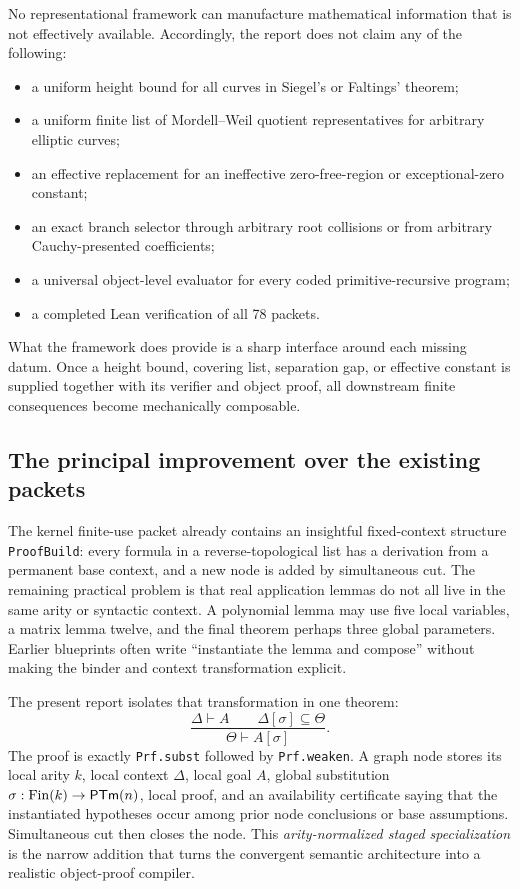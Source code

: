 No representational framework can manufacture mathematical information that is not effectively available.
Accordingly, the report does not claim any of the following:
\begin{itemize}
  \item a uniform height bound for all curves in Siegel's or Faltings' theorem;
  \item a uniform finite list of Mordell--Weil quotient representatives for arbitrary elliptic curves;
  \item an effective replacement for an ineffective zero-free-region or exceptional-zero constant;
  \item an exact branch selector through arbitrary root collisions or from arbitrary Cauchy-presented
        coefficients;
  \item a universal object-level evaluator for every coded primitive-recursive program;
  \item a completed Lean verification of all 78 packets.
\end{itemize}
What the framework does provide is a sharp interface around each missing datum.  Once a height bound,
covering list, separation gap, or effective constant is supplied together with its verifier and object
proof, all downstream finite consequences become mechanically composable.

\subsection{The principal improvement over the existing packets}

The kernel finite-use packet already contains an insightful fixed-context structure \texttt{ProofBuild}:
every formula in a reverse-topological list has a derivation from a permanent base context, and a new node
is added by simultaneous cut.  The remaining practical problem is that real application lemmas do not all
live in the same arity or syntactic context.  A polynomial lemma may use five local variables, a matrix
lemma twelve, and the final theorem perhaps three global parameters.  Earlier blueprints often write
``instantiate the lemma and compose'' without making the binder and context transformation explicit.

The present report isolates that transformation in one theorem:
\begin{equation}
\label{eq:instantiate-into}
  \frac{\Delta\vdash A \qquad
        \Delta[\sigma]\subseteq\Theta}
       {\Theta\vdash A[\sigma]}.
\end{equation}
The proof is exactly \texttt{Prf.subst} followed by \texttt{Prf.weaken}.  A graph node stores its local
arity \(k\), local context \(\Delta\), local goal \(A\), global substitution
\(\sigma:\mathrm{Fin}(k)\to\mathsf{PTm}(n)\), local proof, and an availability certificate saying that the
instantiated hypotheses occur among prior node conclusions or base assumptions.  Simultaneous cut then
closes the node.  This \emph{arity-normalized staged specialization} is the narrow addition that turns the
convergent semantic architecture into a realistic object-proof compiler.
